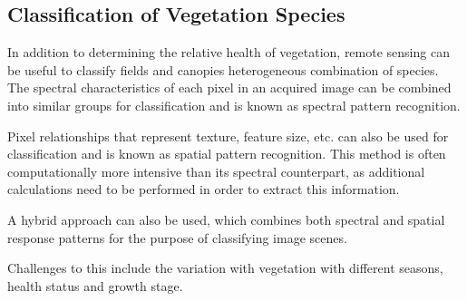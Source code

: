 \subsection{Classification of Vegetation Species}
In addition to determining the relative health of vegetation, remote sensing can be useful to classify fields and canopies heterogeneous combination of species.  The spectral characteristics of each pixel in an acquired image can be combined into similar groups for classification and is known as spectral pattern recognition.

Pixel relationships that represent texture, feature size, etc. can also be used for classification and is known as spatial pattern recognition. This method is often computationally more intensive than its spectral counterpart, as additional calculations need to be performed in order to extract this information.

A hybrid approach can also be used, which combines both spectral and spatial response patterns for the purpose of classifying image scenes.

Challenges to this include the variation with vegetation with different seasons, health status and growth stage.
